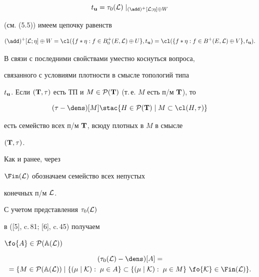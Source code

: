 $$


{t_{\bold u}}={{\tau}_0}({\cal L})\mid_{{(\add)^+}[{\cal L};\eta] \oplus W}


$$


(см. (5.5)) имеем цепочку равенств


$$


{(\add)^+}[{\cal L};\eta] \oplus W = {\cl}(\{{f*\eta}:f \in


{B_0^+}(E,{\cal L}) \oplus U\},{t_{\bold u}}) =


{\cl}(\{{f*\eta}:f \in {B^+}(E,{\cal L}) \oplus V\},{t_{\bold u}}).


$$





В связи с последними свойствами уместно коснуться вопроса,


связанного с условиями плотности в смысле топологий типа


${t_{\bold u}}$. Если $({\bold T},\tau)$ есть ТП и $M \in


{{\cal P}({\bold T})}$ (т.\,е. $M$ есть п/м ${\bold T}$), то


$$


(\tau - {\dens})[M] \stac \{H \in {\cal P}({\bold T}) \mid


M \subset {\cl}(H,\tau)\}


$$


есть семейство всех п/м ${\bold T}$, всюду плотных в $M$ в смысле


$({\bold T},\tau)$.


Как и ранее, через


${\Fin}({\cal L})$ обозначаем семейство всех непустых


конечных п/м ${\cal L}$.


С учетом представления ${{\tau}_0}({\cal L})$


в ([5], c.\,81; [6], c.\,45) получаем


$\fo{A} \in {\cal P}({\Bbb A}({\cal L}))$


\begin{multline}


({{\tau}_0}({\cal L})-{\dens})[A]=\\ = \{M \in {\cal P}({\Bbb A}({\cal L}))


\mid\{(\mu\mid{\cal K}):\;\mu \in A\} \subset


\{(\mu\mid{\cal K}):\;\mu \in M\}


\ \fo{\cal K} \in {\Fin}({\cal L})\}.


\end{multline}


